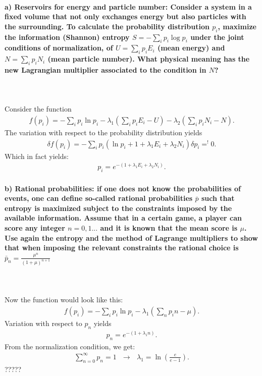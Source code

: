 \paragraph{a) Reservoirs for energy and particle number:
    Consider a system in a fixed volume that not only exchanges energy
    but also particles with the surrounding. To calculate the 
    probability distribution $p_i$, maximize the information 
    (Shannon) entropy $S=-\sum_ip_i\log{p_i}$ under the joint 
    conditions of normalization, of $U=\sum_ip_iE_i$ (mean energy) and 
    $N=\sum_ip_iN_i$ (mean particle number). What physical meaning has 
    the new Lagrangian multiplier associated to the condition in $N$?
} \ \\
\\

Consider the function 
\begin{align}
f(p_i) = - \sum_i p_i \ln p_i - \lambda_1 \left( \sum_i p_i E_i - U \right) - \lambda_2 \left( \sum_i p_i N_i - N \right).
\end{align}
The variation with respect to the probability distribution yields
\begin{align}
\delta f(p_i) = - \sum_i p_i \left( \ln p_i + 1 + \lambda_1 E_i + \lambda_2 N_i \right) \delta p_i =^{!} 0.
\end{align}
Which in fact yields:
\begin{align}
p_i = e^{- (1 + \lambda_1 E_i + \lambda_2 N_i)}.
\end{align}


\paragraph{b) Rational probabilities: if one does not know the 
    probabilities of events, one can define so-called 
    rational probabilities $\bar{p}$ such that entropy is maximized 
    subject to the constraints imposed by the available information.
    Assume that in a certain game, a player can score any integer 
    $n=0,1...$ and it is known that the mean score is $\mu$. Use again
    the entropy and the method of Lagrange multipliers to show that 
    when imposing the relevant constraints the rational choice is 
    $\bar{p}_n=\frac{\mu^n}{(1+\mu)^{n+1}}$
} \ \\
\\

Now the function would look like this:
\begin{align}
f(p_i) = - \sum_i p_i \ln p_i - \lambda_1 \left( \sum_n p_i n - \mu \right).
\end{align}
Variation with respect to $p_n$ yields
\begin{align}
p_n = e^{- (1 + \lambda_1 n)}.
\end{align}
From the normalization condition, we get:
\begin{align}
\sum_{n=0}^{\infty} p_n = 1 \ \ \ \longrightarrow \ \ \ \lambda_1 = \ln\left(\frac{e}{e-1}\right).
\end{align}
?????